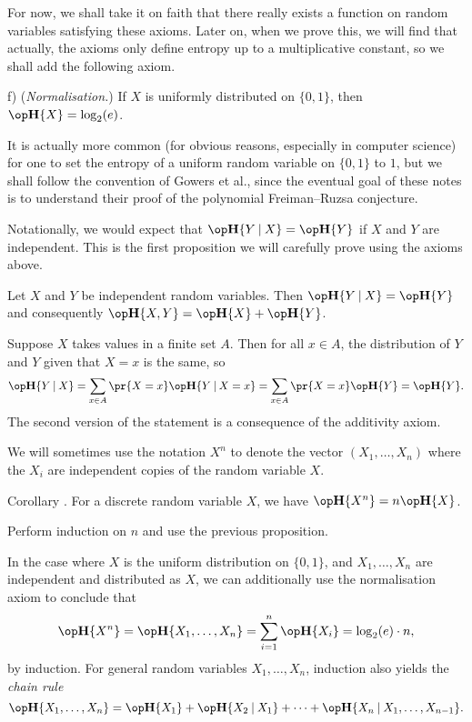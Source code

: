 For now, we shall take it on faith that there really exists a function on random variables satisfying
these axioms. Later on, when we prove this, we will find that actually, the axioms only define entropy
up to a multiplicative constant, so we shall add the following axiom.

\medskip
\item{f)} ({\it Normalisation.}) If $X$ is uniformly distributed on $\{0,1\}$, then
$\Eta\{X\} = \log_2(e)$.
\medskip

It is actually more common (for obvious reasons, especially in computer science)
for one to set the entropy of a uniform random variable on $\{0,1\}$
to $1$, but we shall
follow the convention of Gowers et al., since the eventual goal of these notes is to understand their proof
of the polynomial Freiman--Ruzsa conjecture.

Notationally, we would expect that $\Eta\{Y\given X\} = \Eta\{Y\}$ if $X$ and $Y$ are independent.
This is the first proposition we will carefully prove using the axioms above.

\proclaim Let $X$ and $Y$ be independent random variables. Then
$\Eta\{Y\given X\} = \Eta\{Y\}$ and consequently
$\Eta\{X,Y\} = \Eta\{X\} + \Eta\{Y\}$.

\proof Suppose $X$ takes values in a finite set $A$. Then for all $x\in A$, the distribution of
$Y$ and $Y$ given that $X = x$ is the same, so
$$\Eta\{Y \given X\} = \sum_{x\in A} \pr\{X = x\} \Eta\{Y\given X = x\} = \sum_{x\in A} \pr\{X = x\} \Eta\{Y\}
=\Eta\{Y\}.$$
The second version of the statement is a consequence of the additivity axiom.\slug

We will sometimes use the notation $X^n$ to denote the vector $(X_1,\ldots,X_n)$ where the $X_i$
are independent copies of the random variable $X$.

\proclaim Corollary \advthm. For a discrete random variable $X$, we have $\Eta\{X^n\} = n\Eta\{X\}$.

\proof Perform induction on $n$ and use the previous proposition.\slug

In the case where $X$ is the uniform distribution on $\{0,1\}$, and $X_1,\ldots,X_n$ are independent
and distributed as $X$,
we can additionally use the normalisation axiom to conclude that
$$\Eta\{X^n\} = \Eta\{X_1,\ldots,X_n\} = \sum_{i=1}^n \Eta\{X_i\} = \log_2(e)\cdot n,$$
by induction. For general random variables $X_1,\ldots,X_n$, induction also yields the {\it chain rule}
$$\Eta\{X_1,\ldots,X_n\} = \Eta\{X_1\} + \Eta\{X_2\given X_1\} + \cdots+\Eta\{X_n \given X_1,\ldots,X_{n-1}\}.$$

